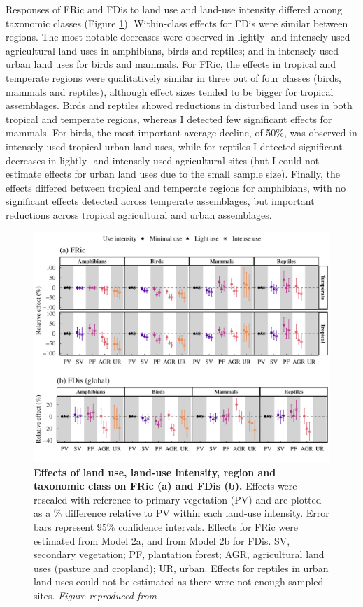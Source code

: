 Responses of FRic and FDis to land use and land-use intensity differed among taxonomic classes (Figure \ref{chap3_fig3}). Within-class effects for FDis were similar between regions. The most notable decreases were observed in lightly- and intensely used agricultural land uses in amphibians, birds and reptiles; and in intensely used urban land uses for birds and mammals. For FRic, the effects in tropical and temperate regions were qualitatively similar in three out of four classes (birds, mammals and reptiles), although effect sizes tended to be bigger for tropical assemblages. Birds and reptiles showed reductions in disturbed land uses in both tropical and temperate regions, whereas I detected few significant effects for mammals. For birds, the most important average decline, of 50\%, was observed in intensely used tropical urban land uses, while for reptiles I detected significant decreases in lightly- and intensely used agricultural sites (but I could not estimate effects for urban land uses due to the small sample size). Finally, the effects differed between tropical and temperate regions for amphibians, with no significant effects detected across temperate assemblages, but important reductions across tropical agricultural and urban assemblages.

\begin{figure}[h!]
\centering
\includegraphics[scale=0.75]{figures/Chapter_FD/Figure3}
\caption[Effects of land use, land-use intensity, region and taxonomic class on FRic (a) and FDis (b).]{\textbf{Effects of land use, land-use intensity, region and taxonomic class on FRic (a) and FDis (b).} Effects were rescaled with reference to primary vegetation (PV) and are plotted as a \% difference relative to PV within each land-use intensity. Error bars represent 95\% confidence intervals. Effects for FRic were estimated from Model 2a, and from Model 2b for FDis. SV, secondary vegetation; PF, plantation forest; AGR, agricultural land uses (pasture and cropland); UR, urban. Effects for reptiles in urban land uses could not be estimated as there were not enough sampled sites. \textit{Figure reproduced from \citet{Etard2022}.}}
\label{chap3_fig3}
\end{figure}

